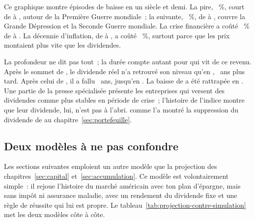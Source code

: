 Ce graphique montre \NombreBaisses{} \'episodes de baisse en un si\`ecle et demi. La pire,
\GroessterEinbruch~\%, court de \GroessterEinbruchDebut{} \`a \GroessterEinbruchJahr, autour de la
Premi\`ere Guerre mondiale~; la suivante, \BaisseLongue~\%, de \BaisseLongueDebut{} \`a
\BaisseLongueFin, couvre la Grande D\'epression et la Seconde Guerre mondiale. La crise financi\`ere a
co\^ut\'e \EinbruchRecent~\% de \EinbruchRecentDebut{} \`a \EinbruchRecentFin. La d\'ecennie
d'inflation, de \EinbruchInflationDebut{} \`a \EinbruchInflationFin, a co\^ut\'e \EinbruchInflation~\%,
surtout parce que les prix montaient plus vite que les dividendes.

La profondeur ne dit pas tout~; la dur\'ee compte autant pour qui vit de ce revenu. Apr\`es le sommet
de \GroessterEinbruchDebut, le dividende r\'eel n'a retrouv\'e son niveau qu'en
\GroessterEinbruchRetour, \GroessterEinbruchSousSommetAns~ans plus tard. Apr\`es celui de
\BaisseLongueDebut, il a fallu \BaisseLongueAns~ans, jusqu'en \BaisseLongueRetour. La baisse de
\EinbruchRecentDebut{} a \'et\'e rattrap\'ee en \EinbruchRecentRetour. Une partie de la presse
sp\'ecialis\'ee pr\'esente les entreprises qui versent des dividendes comme plus stables en p\'eriode
de crise~; l'histoire de l'indice montre que leur dividende, lui, n'est pas
\`a l'abri.  comme l'a montr\'e la suppression du dividende de \BeispielBaisse{} au
chapitre~\ref{sec:portefeuille}.

\subsection{Deux mod\`eles \`a ne pas confondre}\label{sec:risques-modeles}

Les sections suivantes emploient un autre mod\`ele que la projection des
chapitres~\ref{sec:capital} et~\ref{sec:accumulation}. Ce mod\`ele est volontairement simple~: il
rejoue l'histoire du march\'e am\'ericain avec ton plan d'\'epargne, mais sans imp\^ot ni assurance
maladie, avec un rendement du dividende fixe et une r\`egle de r\'eussite qui lui est propre. Le
tableau~\ref{tab:projection-contre-simulation} met les deux mod\`eles c\^ote \`a c\^ote.

